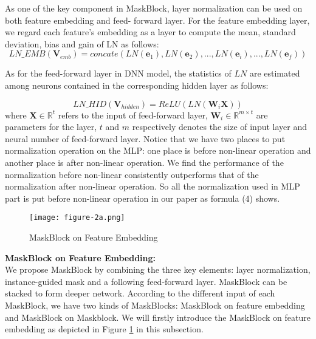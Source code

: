 \documentclass[sigconf]{acmart}
\begin{document}
As one of the key component in MaskBlock, layer normalization can be used on both feature embedding and feed- forward layer. For the feature embedding layer, we regard each feature's embedding as a layer to compute the mean, standard deviation, bias and gain of LN as follows:
\begin{equation}
  LN\_EMB(\mathbf{V}_{emb}) = concate\left(LN(\mathbf{e}_1), LN(\mathbf{e}_2), ..., LN(\mathbf{e}_i), ..., LN(\mathbf{e}_f)\right)
\end{equation}


As for the feed-forward layer in DNN model, the statistics of $LN$ are estimated among neurons contained in the corresponding hidden layer as follows:

\begin{equation}
  LN\_HID(\mathbf{V}_{hidden}) = ReLU(LN(\mathbf{W}_i\mathbf{X}))
\end{equation}
where $\mathbf{X} \in \mathbb{R}^t$ refers to the input of feed-forward layer, $\mathbf{W}_i \in \mathbb{R}^{m \times t}$ are parameters for the layer, $t$ and $m$ respectively denotes the  size of input layer and neural number of feed-forward layer. Notice that we have two places to put normalization operation on the MLP: one place is before non-linear operation and another place is after non-linear operation. We find the performance of the normalization before non-linear consistently outperforms that of the normalization after non-linear operation. So all the normalization used in MLP part is put before non-linear operation in our paper as formula (4) shows.

\begin{figure}
  \setlength{\abovecaptionskip}{1pt}
  \texttt{[image: figure-2a.png]}
  \caption{MaskBlock on Feature Embedding}
  \label{Fig.figure-2a}
\end{figure}






\noindent\textbf{MaskBlock on Feature Embedding:}\\
\noindent We propose MaskBlock by combining the three key elements: layer normalization, instance-guided mask and a following feed-forward layer. MaskBlock can be stacked to form deeper network. According to the different input of each MaskBlock, we have two kinds of  MaskBlocks: MaskBlock on feature embedding and MaskBlock on Maskblock. We will firstly introduce the MaskBlock on feature embedding as depicted in Figure \ref{Fig.figure-2a} in this subsection.
\end{document}
